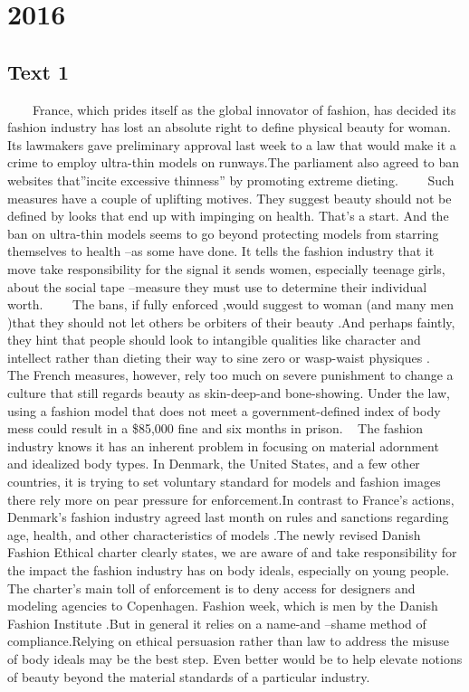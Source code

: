
\section{2016}
\subsection{Text 1}
　　France, which prides itself as the global innovator of fashion, has decided its fashion industry has lost an absolute right to define physical beauty for woman. Its lawmakers gave preliminary approval last week to a law that would make it a crime to employ ultra-thin models on runways.The parliament also agreed to ban websites that”incite excessive thinness” by promoting extreme dieting.
　　Such measures have a couple of uplifting motives. They suggest beauty should not be defined by looks that end up with impinging on health. That’s a start. And the ban on ultra-thin models seems to go beyond protecting models from starring themselves to health –as some have done. It tells the fashion industry that it move take responsibility for the signal it sends women, especially teenage girls, about the social tape –measure they must use to determine their individual worth.
　　The bans, if fully enforced ,would suggest to woman (and many men )that they should not let others be orbiters of their beauty .And perhaps faintly, they hint that people should look to intangible qualities like character and intellect rather than dieting their way to sine zero or wasp-waist physiques .
     The French measures, however, rely too much on severe punishment to change a culture that still regards beauty as skin-deep-and bone-showing. Under the law, using a fashion model that does not meet a government-defined index of body mess could result in a \$85,000 fine and six months in prison.
     The fashion industry knows it has an inherent problem in focusing on material adornment and idealized body types. In Denmark, the United States, and a few other countries, it is trying to set voluntary standard for models and fashion images there rely more on pear pressure for enforcement.In contrast to France’s actions, Denmark’s fashion industry agreed last month on rules and sanctions regarding age, health, and other characteristics of models .The newly revised Danish Fashion Ethical charter clearly states, we are aware of and take responsibility for the impact the fashion industry has on body ideals, especially on young people. The charter’s main toll of enforcement is to deny access for designers and modeling agencies to Copenhagen. Fashion week, which is men by the Danish Fashion Institute .But in general it relies on a name-and –shame method of compliance.Relying on ethical persuasion rather than law to address the misuse of body ideals may be the best step. Even better would be to help elevate notions of beauty beyond the material standards of a particular industry.
